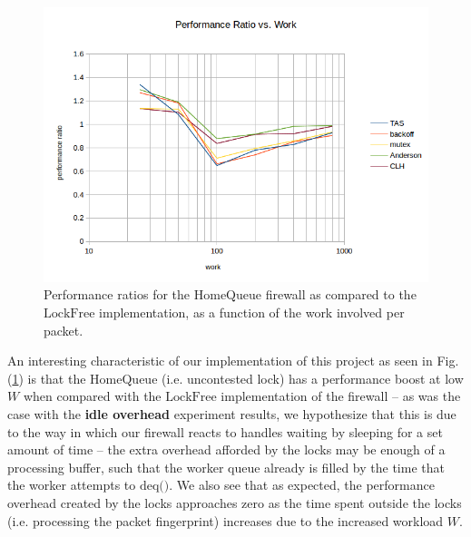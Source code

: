 \documentclass{article}
\newcommand{\figref}[1]{Fig. (\ref{#1})}
\newcommand{\tb}[1]{\textbf{#1}}
\newcommand{\cpart}[1]{\newblock{\LARGE {\\\\#1}}}
\newcommand{\code}[1]{\texttt{$\text{#1}$}}
\begin{document}
\begin{figure}
\begin{center}
	\includegraphics[scale=.8]{packet_1.png}
	\caption{Performance ratios for the \code{HomeQueue} firewall as compared to the \code{LockFree} implementation, as a function of the work involved per packet.}
	\label{packet_1}
\end{center}
\end{figure}

An interesting characteristic of our implementation of this project as seen in \figref{packet_1} is that the \code{HomeQueue} (i.e. uncontested lock) has a 
performance boost at low $W$ when compared with the \code{LockFree} implementation of the firewall -- as was the case with the \tb{idle overhead} experiment 
results, we hypothesize that this is due to the way in which our firewall reacts to handles waiting by sleeping for a set amount of time -- the extra overhead 
afforded by the locks may be enough of a processing buffer, such that the worker queue already is filled by the time that the worker attempts to \code{deq()}. We also 
see that as expected, the performance overhead created by the locks approaches zero as the time spent outside the locks (i.e. processing the packet fingerprint) 
increases due to the increased workload $W$.

\cpart{Packet Scaling}
\end{document}
